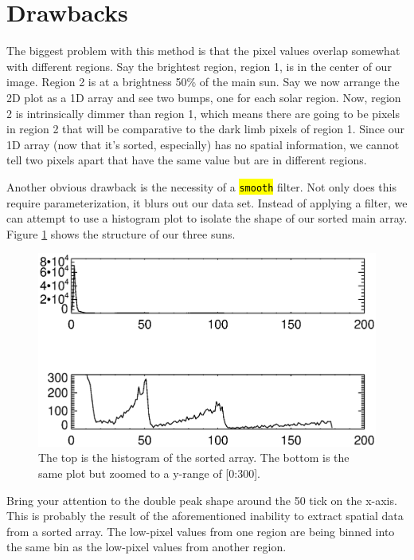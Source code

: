 \documentclass[10pt]{article}
\begin{document}


\section{Drawbacks} %
\label{sec:drawbacks}
    
    The biggest problem with this method is that the pixel values overlap somewhat with different regions. Say the brightest region, region 1, is in the center of our image. Region 2 is at a brightness 50\% of the main sun. Say we now arrange the 2D plot as a 1D array and see two bumps, one for each solar region. Now, region 2 is intrinsically dimmer than region 1, which means there are going to be pixels in region 2 that will be comparative to the dark limb pixels of region 1. Since our 1D array (now that it's sorted, especially) has no spatial information, we cannot tell two pixels apart that have the same value but are in different regions. 

    Another obvious drawback is the necessity of a \hl{\texttt{smooth}} filter. Not only does this require parameterization, it blurs out our data set. Instead of applying a filter, we can attempt to use a histogram plot to isolate the shape of our sorted main array. Figure \ref{histozoom} shows the structure of our three suns.

\begin{figure}[!ht]
    \centering
    \includegraphics[width=.9\textwidth]{plots_tables_images/histozoom.eps}
    \caption{The top is the histogram of the sorted array. The bottom is the same plot but zoomed to a y-range of [0:300].}
    \label{histozoom}
\end{figure}

    Bring your attention to the double peak shape around the 50 tick on the x-axis. This is probably the result of the aforementioned inability to extract spatial data from a sorted array. The low-pixel values from one region are being binned into the same bin as the low-pixel values from another region. 
\end{document}
